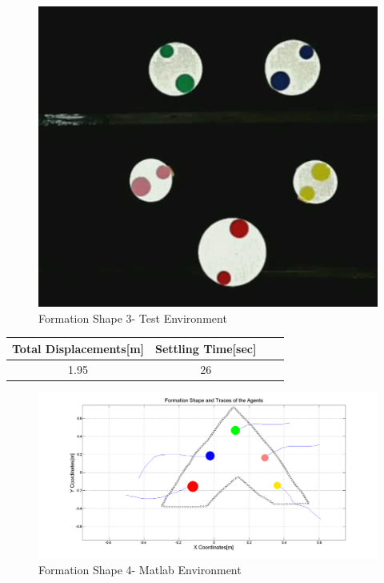\begin{figure}[H]
\caption{Formation Shape 3- Test Environment}
\centerline{\includegraphics[scale = 0.35]{5_real_hardware}}
\end{figure} 
					
\begin{center}
 \label{hardwareshape3_ref} 
\begin{tabular}{||c| c |c |c ||}
\hline
\textbf{Total Displacements[m]}  & \textbf{Settling Time[sec]}\\ 
\hline
1.95 & 26 \\
\hline
\end{tabular}
\end{center}
		
\begin{figure}[H]
\caption{Formation Shape 4- Matlab Environment}
\centerline{\includegraphics[scale = 0.32]{6_hardware}}
\end{figure} 
					
